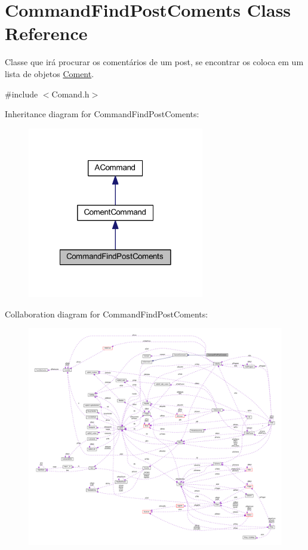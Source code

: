 \hypertarget{class_command_find_post_coments}{\section{Command\-Find\-Post\-Coments Class Reference}
\label{class_command_find_post_coments}
}


Classe que irá procurar os comentários de um post, se encontrar os coloca em um lista de objetos \hyperlink{class_coment}{Coment}.  




{\ttfamily \#include $<$Comand.\-h$>$}



Inheritance diagram for Command\-Find\-Post\-Coments\-:\nopagebreak
\begin{figure}[H]
\begin{center}
\leavevmode
\includegraphics[width=218pt]{class_command_find_post_coments__inherit__graph}
\end{center}
\end{figure}


Collaboration diagram for Command\-Find\-Post\-Coments\-:\nopagebreak
\begin{figure}[H]
\begin{center}
\leavevmode
\includegraphics[width=350pt]{class_command_find_post_coments__coll__graph}
\end{center}
\end{figure}
